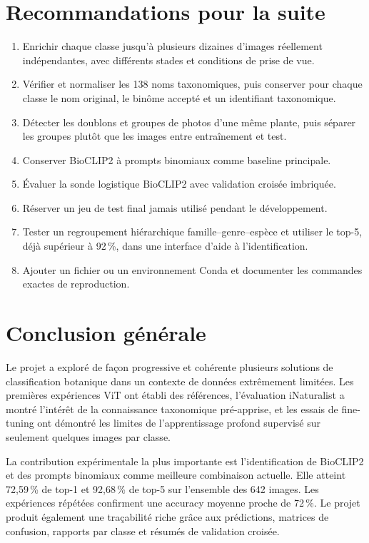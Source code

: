 \documentclass[11pt,a4paper]{report}
\newcommand{\code}[1]{\texttt{\detokenize{#1}}}
\newcommand{\pct}[1]{#1\,\%}
\begin{document}
\chapter{Recommandations pour la suite}

\begin{enumerate}
  \item Enrichir chaque classe jusqu'à plusieurs dizaines d'images réellement
  indépendantes, avec différents stades et conditions de prise de vue.
  \item Vérifier et normaliser les 138 noms taxonomiques, puis conserver pour
  chaque classe le nom original, le binôme accepté et un identifiant taxonomique.
  \item Détecter les doublons et groupes de photos d'une même plante, puis séparer
  les groupes plutôt que les images entre entraînement et test.
  \item Conserver BioCLIP2 à prompts binomiaux comme baseline principale.
  \item Évaluer la sonde logistique BioCLIP2 avec validation croisée imbriquée.
  \item Réserver un jeu de test final jamais utilisé pendant le développement.
  \item Tester un regroupement hiérarchique famille--genre--espèce et utiliser le
  top-5, déjà supérieur à \pct{92}, dans une interface d'aide à l'identification.
  \item Ajouter un fichier \code{requirements.txt} ou un environnement Conda et
  documenter les commandes exactes de reproduction.
\end{enumerate}

\chapter{Conclusion générale}

Le projet a exploré de façon progressive et cohérente plusieurs solutions de
classification botanique dans un contexte de données extrêmement limitées.
Les premières expériences ViT ont établi des références, l'évaluation iNaturalist
a montré l'intérêt de la connaissance taxonomique pré-apprise, et les essais de
fine-tuning ont démontré les limites de l'apprentissage profond supervisé sur
seulement quelques images par classe.

La contribution expérimentale la plus importante est l'identification de BioCLIP2
et des prompts binomiaux comme meilleure combinaison actuelle. Elle atteint
\pct{72,59} de top-1 et \pct{92,68} de top-5 sur l'ensemble des 642 images.
Les expériences répétées confirment une accuracy moyenne proche de \pct{72}.
Le projet produit également une traçabilité riche grâce aux prédictions,
matrices de confusion, rapports par classe et résumés de validation croisée.
\end{document}
